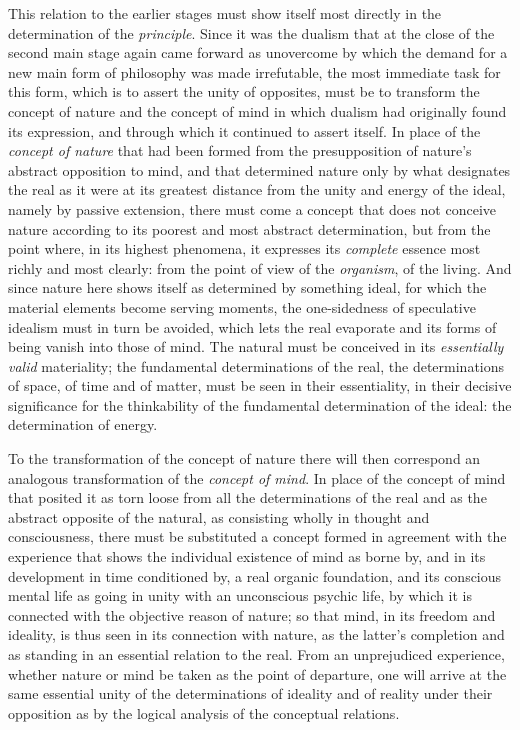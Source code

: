 This relation to the earlier stages must show itself most directly in
the determination of the \emph{principle}. Since it was the dualism
that at the close of the second main stage again came
forward as unovercome by which the demand for a new main form of
philosophy was made irrefutable, the most immediate task for this form,
which is to assert the unity of opposites, must be to transform the
concept of nature and the concept of mind in which dualism had
originally found its expression, and through which it continued to
assert itself. In place of the \emph{concept of nature} that had been
formed from the presupposition of nature's abstract opposition to mind,
and that determined nature only by what designates the real as it were
at its greatest distance from the unity and energy of the ideal, namely
by passive extension, there must come a concept that does not conceive
nature according to its poorest and most abstract determination, but
from the point where, in its highest phenomena, it expresses its
\emph{complete} essence most richly and most clearly: from the point of
view of the \emph{organism}, of the living. And since nature here shows
itself as determined by something ideal, for which the material
elements become serving moments, the one-sidedness of speculative
idealism must in turn be avoided, which lets the real evaporate and its
forms of being vanish into those of mind. The natural must be conceived
in its \emph{essentially valid} materiality; the fundamental
determinations of the real, the determinations of space, of time and of
matter, must be seen in their essentiality, in their decisive
significance for the thinkability of the fundamental determination of
the ideal: the determination of energy.

To the transformation of the concept of nature there will then
correspond an analogous transformation of the \emph{concept of mind}.
In place of the concept of mind that posited it as torn loose from all
the determinations of the real and as the abstract opposite of the
natural, as consisting wholly in thought and consciousness, there must
be substituted a concept formed in agreement with the experience that
shows the individual existence of mind as borne by, and in its
development in time conditioned by, a real organic foundation, and its
conscious mental life as going in unity with an unconscious psychic
life, by which it is connected with the objective reason of nature; so
that mind, in its freedom and ideality, is thus seen in its
con\setcounter{footnote}{0}nection with nature, as the
latter's completion and as standing in an essential relation to the
real. From an unprejudiced experience, whether nature or mind be taken
as the point of departure, one will arrive at the same essential unity
of the determinations of ideality and of reality under their opposition
as by the logical analysis of the conceptual relations.

